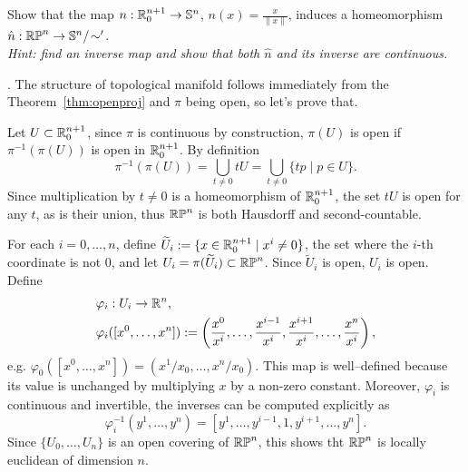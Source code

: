 \begin{example}
  \begin{exercise}\label{exe:RPSN}
    Show that the map $n: \mathbb{R}^{n+1}_0\to \mathbb{S}^n$, $n(x) = \frac{x}{\|x\|}$, induces a homeomorphism $\hat n:\mathbb{RP}^n \to \mathbb{S}^n/\!\sim'$.\\
    \textit{\small Hint: find an inverse map and show that both $\hat n$ and its inverse are continuous.}
  \end{exercise}

  .
  The structure of topological manifold follows immediately from the Theorem~\ref{thm:openproj} and $\pi$ being open, so let's prove that.

  Let $U\subset\mathbb{R}_0^{n+1}$, since $\pi$ is continuous by construction, $\pi(U)$ is open if $\pi^{-1}(\pi(U))$ is open in $\mathbb{R}^{n+1}_0$.
  By definition
  \begin{equation}
    \pi^{-1}(\pi(U)) = \bigcup_{t\neq 0} tU = \bigcup_{t\neq 0}\{tp \mid p\in U\}.
  \end{equation}
  Since multiplication by $t\neq 0$ is a homeomorphism of $\mathbb{R}_0^{n+1}$, the set $t U$ is open for any $t$, as is their union, thus $\mathbb{RP}^n$ is both Hausdorff and second-countable.

  For each $i=0,\ldots,n$, define $\widetilde U_i := \{x\in\mathbb{R}^{n+1}_0 \mid x^i\neq0\}$, the set where the $i$-th coordinate is not $0$, and let $U_i = \pi(\widetilde U_i)\subset \mathbb{RP}^n$.
  Since $\widetilde U_i$ is open, $U_i$ is open.
  Define
  \begin{align}
     & \varphi_i:U_i\to\mathbb{R}^n,                                                                                                               \\
     & \varphi_i([x^0, \ldots, x^n]):= \left(\frac{x^0}{x^i},\ldots,\frac{x^{i-1}}{x^i},\frac{x^{i+1}}{x^i},\ldots,\frac{x^n}{x^i}\right),
  \end{align}
  e.g. $\varphi_0([x^0, \ldots, x^n]) = (x^1/x_0, \ldots, x^n/x_0)$.
  This map is well--defined because its value is unchanged by multiplying $x$ by a non-zero constant.
  Moreover, $\varphi_i$ is continuous and invertible, the inverses can be computed explicitly as
  \begin{equation}
    \varphi_i^{-1}(y^1,\ldots,y^n) = \left[y^1, \ldots, y^{i-1}, 1, y^{i+1}, \ldots, y^n\right].
  \end{equation}
  Since $\{U_0, \ldots, U_n\}$ is an open covering of $\mathbb{RP}^n$, this shows tht $\mathbb{RP}^n$ is locally euclidean of dimension $n$.


\end{example}
